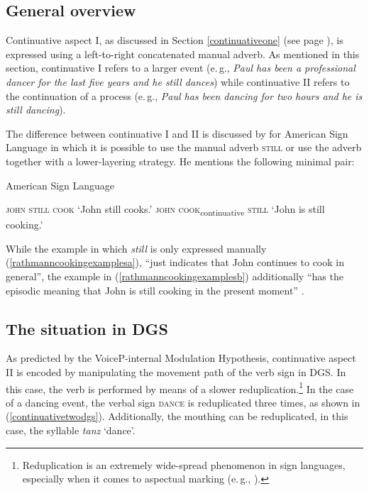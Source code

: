 \subsection{General overview}
Continuative aspect I, as discussed in Section \ref{continuativeone} (see page \pageref{continuativeone}), is expressed using a left-to-right concatenated manual adverb. As mentioned in this section, continuative I refers to a larger event (e.\,g., \textit{Paul has been a professional dancer for the last five years and he still dances}) while continuative II refers to the continuation of a process (e.\,g., \textit{Paul has been dancing for two hours and he is still dancing}).

The difference between continuative I and II is discussed by \citet[35]{rathmann2005event} for American Sign Language in which it is possible to use the manual adverb \textsc{still} or use the adverb together with a lower-layering strategy. He mentions the following minimal pair:

\begin{exe}
\ex American Sign Language \citep[35]{rathmann2005event}\label{rathmanncookingexamples}\begin{xlist}
\ex \textsc{john still cook}
\glt `John still cooks.' \label{rathmanncookingexamplesa}
\ex \textsc{john cook}\textsubscript{continuative} \textsc{still}
\glt `John is still cooking.' \label{rathmanncookingexamplesb}

\end{xlist}
\end{exe}

\noindent While the example in which \textit{still} is only expressed manually (\ref{rathmanncookingexamplesa}), ``just indicates that John continues to cook in general'', the example in (\ref{rathmanncookingexamplesb}) additionally ``has the episodic meaning that John is still cooking in the present moment'' \citep[35]{rathmann2005event}. 

\subsection{The situation in DGS}
As predicted by the VoiceP-internal Modulation Hypothesis, continuative aspect II is encoded by manipulating the movement path of the verb sign in DGS. In this case, the verb is performed by means of a slower reduplication.\footnote{ Reduplication is an extremely wide-spread phenomenon in sign languages, especially when it comes to aspectual marking (e.\,g., \citealt{klima1979signs, wilbur2005reanalysis, wilbur2009productive}).} In the case of a dancing event, the verbal sign \textsc{dance} is reduplicated three times, as shown in (\ref{continuativetwodgs}). Additionally, the mouthing can be reduplicated, in this case, the syllable \textit{tanz} `dance'. 

